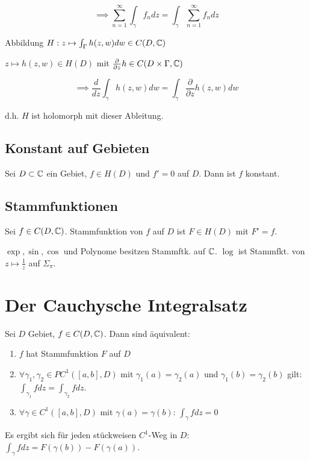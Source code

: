 \vspace*{-2mm}
$$\implies \displaystyle\sum_{n=1}^\infty \int_\gamma f_n dz = \int_\gamma \displaystyle\sum_{n=1}^\infty f_n dz$$

Abbildung $H : z \mapsto \int_\Gamma h(z,w) dw \in C(D,\mathbb{C})$

\spacing

$z \mapsto h(z,w) \in H(D)$ mit $\frac{\partial}{\partial z} h \in C(D \times \Gamma, \mathbb{C})$

\vspace*{-2mm}
$$\implies \frac{d}{dz} \int_\gamma h(z,w) dw = \int_\gamma \frac{\partial}{\partial z} h(z,w) dw$$

d.h. $H$ ist holomorph mit dieser Ableitung.

\subsection*{Konstant auf Gebieten}

Sei $D \subset \mathbb{C}$ ein Gebiet, $f \in H(D)$ und $f'=0$ auf $D$. Dann ist $f$ konstant.

\subsection*{Stammfunktionen}

Sei $f \in C(D,\mathbb{C})$. Stammfunktion von $f$ auf $D$ ist $F \in H(D)$ mit $F'=f$.

$\exp, \sin, \cos$ und Polynome besitzen Stammftk. auf $\mathbb{C}$. $\log$ ist Stammfkt. von $z \mapsto \frac{1}{z}$ auf $\Sigma_\pi$.

\section*{Der Cauchysche Integralsatz}

Sei $D$ Gebiet, $f \in C(D,\mathbb{C})$. Dann sind äquivalent:

\begin{enumerate}[label=(\alph*)]
	\item $f$ hat Stammfunktion $F$ auf $D$
	\item $\forall \gamma_1, \gamma_2 \in PC^1([a,b],D)$ mit $\gamma_1(a)=\gamma_2(a)$ und $\gamma_1(b)=\gamma_2(b)$ gilt: $\int_{\gamma_1} f dz = \int_{\gamma_2} f dz$.
	\item $\forall \gamma \in C^1([a,b],D)$ mit $\gamma(a)=\gamma(b)$: $\int_\gamma f dz = 0$
\end{enumerate}

Es ergibt sich für jeden stückweisen $C^1$-Weg in $D$: $\int_\gamma f dz = F(\gamma(b)) - F(\gamma(a))$.

